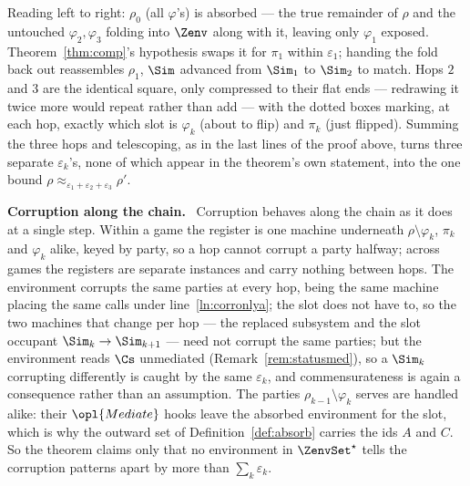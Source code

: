 \documentclass[10pt,oneside,openany]{book}
\newif\iffitdiagram \fitdiagramtrue
\newcounter{diagram}
\newcommand{\heading}[1]{\medskip\par\noindent\textcolor{accent}{\textbf{#1.}}\ }
\theoremstyle{accentdef}
\theoremstyle{accentplain}
\begin{document}
\begin{center}
{{%
}}
\fitdiagramtrue
\end{center}
\clearpage

Reading left to right: $\rho_0$ (all $\varphi$'s) is absorbed --- the true remainder of $\rho$
and the untouched $\varphi_2,\varphi_3$ folding into $\Zenv$ along with it, leaving only
$\varphi_1$ exposed. Theorem~\ref{thm:comp}'s hypothesis swaps it for $\pi_1$ within
$\varepsilon_1$; handing the fold back out reassembles $\rho_1$, $\Sim$ advanced from $\Sim_1$ to
$\Sim_2$ to match. Hops $2$ and $3$ are the identical square, only compressed to their flat ends
--- redrawing it twice more would repeat rather than add --- with the dotted boxes marking, at
each hop, exactly which slot is $\varphi_k$ (about to flip) and $\pi_k$ (just flipped). Summing
the three hops and telescoping, as in the last lines of the proof above, turns three separate
$\varepsilon_k$'s, none of which appear in the theorem's own statement, into the one bound
$\rho \approx_{\varepsilon_1+\varepsilon_2+\varepsilon_3} \rho'$.

\heading{Corruption along the chain} Corruption behaves along the chain as it does at a single
step. Within a game the register is one machine underneath $\rho \setminus \varphi_k$, $\pi_k$ and
$\varphi_k$ alike, keyed by party, so a hop cannot corrupt a party halfway; across games the
registers are separate instances and carry nothing between hops. The environment corrupts the same
parties at every hop, being the same machine placing the same calls under
line~\ref{ln:corronlya}; the slot does not have to, so the two machines that change per hop --- the
replaced subsystem and the slot occupant $\Sim_k \to \Sim_{k+1}$ --- need not corrupt the same
parties; but the environment reads $\Cs$ unmediated (Remark~\ref{rem:statusmed}), so a $\Sim_k$
corrupting differently is caught by the same $\varepsilon_k$, and commensurateness is again a
consequence rather than an assumption. The parties $\rho_{k-1} \setminus \varphi_k$ serves are
handled alike: their $\opl{Mediate}$ hooks leave the absorbed environment for the slot, which is
why the outward set of Definition~\ref{def:absorb} carries the ids $A$ and $C$. So the theorem
claims only that no environment in $\ZenvSet^{\star}$ tells the corruption patterns apart by more
than $\sum_k \varepsilon_k$.
\end{document}
